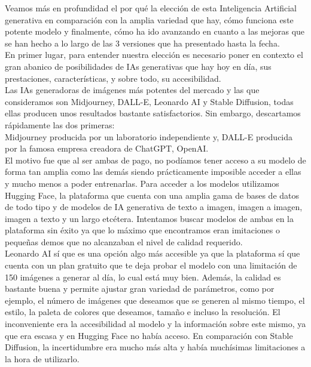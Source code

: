 Veamos más en profundidad el por qué la elección de esta Inteligencia Artificial generativa en comparación con la amplia variedad que hay, cómo funciona este potente modelo y finalmente, cómo ha ido avanzando en cuanto a las mejoras que se han hecho a lo largo de las 3 versiones que ha presentado hasta la fecha. \\

En primer lugar, para entender nuestra elección es necesario poner en contexto el gran abanico de posibilidades de IAs generativas que hay hoy en día, sus prestaciones, características, y sobre todo, su accesibilidad. \\

Las IAs generadoras de imágenes más potentes del mercado y las que consideramos son Midjourney, DALL-E, Leonardo AI y Stable Diffusion, todas ellas producen unos resultados bastante satisfactorios. Sin embargo, descartamos rápidamente las dos primeras: \\

Midjourney producida por un laboratorio independiente y,
DALL-E producida por la famosa empresa creadora de ChatGPT, OpenAI.\\

El motivo fue que al ser ambas de pago, no podíamos tener acceso a su modelo de forma tan amplia como las demás siendo prácticamente imposible acceder a ellas y mucho menos a poder entrenarlas. Para acceder a los modelos utilizamos Hugging Face, la plataforma  que cuenta con una amplia gama de bases de datos de todo tipo y de modelos de IA generativa de texto a imagen, imagen a imagen, imagen a texto y un largo etcétera. Intentamos buscar modelos de ambas en la plataforma sin éxito ya que lo máximo que encontramos eran imitaciones o pequeñas demos que no alcanzaban el nivel de calidad requerido. \\

Leonardo AI sí que es una opción algo más accesible ya que la plataforma sí que cuenta con un plan gratuito que te deja probar el modelo con una limitación de 150 imágenes a generar al día, lo cual está muy bien. Además, la calidad es bastante buena y permite ajustar gran variedad de parámetros, como por ejemplo, el número de imágenes que deseamos que se generen al mismo tiempo, el estilo, la paleta de colores que deseamos, tamaño e incluso la resolución. El inconveniente era la accesibilidad al modelo y la información sobre este mismo, ya que era escasa y en Hugging Face no había acceso. En comparación con Stable Diffusion, la incertidumbre era mucho más alta y había muchísimas limitaciones a la hora de utilizarlo. \\

